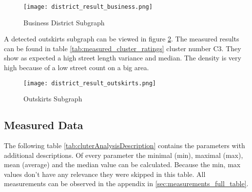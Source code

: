 \begin{figure}[ht]
    \centering
    \begin{mdframed}[style=mdthight, userdefinedwidth=0.4\textwidth, align=center]
        \texttt{[image: district\_result\_business.png]}
    \end{mdframed}
    \caption{Business District Subgraph}
    \label{fig:result_business_district}
\end{figure}
\FloatBarrier

A detected outskirts subgraph can be viewed in figure \ref{fig:result_outskirts_district}. The measured results can be found in table \ref{tab:measured_cluster_ratings} cluster number C3. They show as expected a high street length variance and median. The density is very high because of a low street count on a big area.

\begin{figure}[ht]
    \centering
    \begin{mdframed}[style=mdthight, userdefinedwidth=0.4\textwidth, align=center]
        \texttt{[image: district\_result\_outskirts.png]}
    \end{mdframed}
    \caption{Outskirts Subgraph}
    \label{fig:result_outskirts_district}
\end{figure}
\FloatBarrier

\FloatBarrier
\subsection{Measured Data}
\label{sec:ClusterAnalysisMeasurements}
The following table \ref{tab:cluterAnalysisDescription} contains the parameters with additional descriptions. Of every parameter the minimal (min), maximal (max), mean (average) and the median value can be calculated. Because the min, max values don't have any relevance they were skipped in this table. All measurements can be observed in the appendix in \ref{sec:measurements_full_table}.

